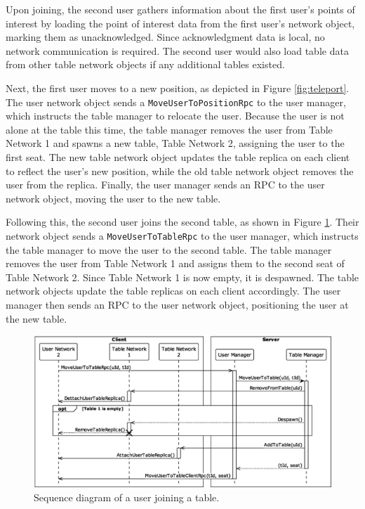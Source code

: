         Upon joining, the second user gathers information about the first user's points of interest by loading the point of interest data from the first user's network object, marking them as unacknowledged. Since acknowledgment data is local, no network communication is required. The second user would also load table data from other table network objects if any additional tables existed.

        Next, the first user moves to a new position, as depicted in Figure \ref{fig:teleport}. The user network object sends a \lstinline{MoveUserToPositionRpc} to the user manager, which instructs the table manager to relocate the user. Because the user is not alone at the table this time, the table manager removes the user from Table Network 1 and spawns a new table, Table Network 2, assigning the user to the first seat. The new table network object updates the table replica on each client to reflect the user's new position, while the old table network object removes the user from the replica. Finally, the user manager sends an RPC to the user network object, moving the user to the new table.

        Following this, the second user joins the second table, as shown in Figure \ref{fig:table_join}. Their network object sends a \lstinline{MoveUserToTableRpc} to the user manager, which instructs the table manager to move the user to the second table. The table manager removes the user from Table Network 1 and assigns them to the second seat of Table Network 2. Since Table Network 1 is now empty, it is despawned. The table network objects update the table replicas on each client accordingly. The user manager then sends an RPC to the user network object, positioning the user at the new table.
        
        \begin{figure}[h!]
            \centering
            \includegraphics[width=.85\linewidth]{diagrams/out/table_join.eps}
            \caption{Sequence diagram of a user joining a table.}
            \label{fig:table_join}
        \end{figure}

